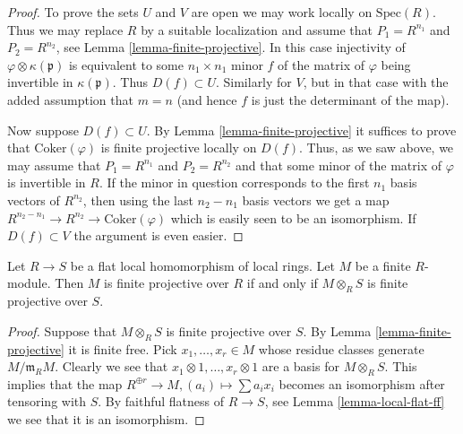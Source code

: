 \begin{proof}
To prove the sets $U$ and $V$ are open we may work locally on
$\text{Spec}(R)$. Thus we may replace $R$ by a suitable localization
and assume that $P_1 = R^{n_1}$ and $P_2=R^{n_2}$, see Lemma
\ref{lemma-finite-projective}. In this case injectivity of
$\varphi \otimes \kappa(\mathfrak p)$ is equivalent to
some $n_1 \times n_1$ minor $f$ of the matrix of $\varphi$ being
invertible in $\kappa(\mathfrak p)$. Thus $D(f) \subset U$.
Similarly for $V$, but in that case with the added assumption
that $m = n$ (and hence $f$ is just the determinant of the map).

\medskip\noindent
Now suppose $D(f) \subset U$. By Lemma \ref{lemma-finite-projective}
it suffices to prove that $\text{Coker}(\varphi)$ is finite projective
locally on $D(f)$. Thus, as we saw above, we may
assume that $P_1 = R^{n_1}$ and $P_2=R^{n_2}$
and that some minor of the matrix of $\varphi$ is invertible in $R$.
If the minor in question corresponds to the first $n_1$
basis vectors of $R^{n_2}$, then using the last $n_2-n_1$ basis
vectors we get a map $R^{n_2 - n_1} \to
R^{n_2} \to \text{Coker}(\varphi)$ which is easily seen to be
an isomorphism. If $D(f) \subset V$ the argument is even easier.
\end{proof}

\begin{lemma}
\label{lemma-finite-projective-descends}
Let $R \to S$ be a flat local homomorphism of local rings.
Let $M$ be a finite $R$-module. Then $M$ is finite projective
over $R$ if and only if $M \otimes_R S$ is finite projective
over $S$.
\end{lemma}

\begin{proof}
Suppose that $M\otimes_R S$ is finite projective
over $S$. By Lemma \ref{lemma-finite-projective} 
it is finite free. Pick $x_1, \ldots, x_r \in M$ whose
residue classes generate $M/\mathfrak m_RM$. Clearly
we see that $x_1 \otimes 1, \ldots, x_r \otimes 1$
are a basis for $M \otimes_R S$. This implies that
the map $R^{\oplus r} \to M, (a_i) \mapsto \sum a_i x_i$
becomes an isomorphism after tensoring with $S$.
By faithful flatness of $R \to S$, see Lemma \ref{lemma-local-flat-ff}
we see that it is an isomorphism.
\end{proof}












